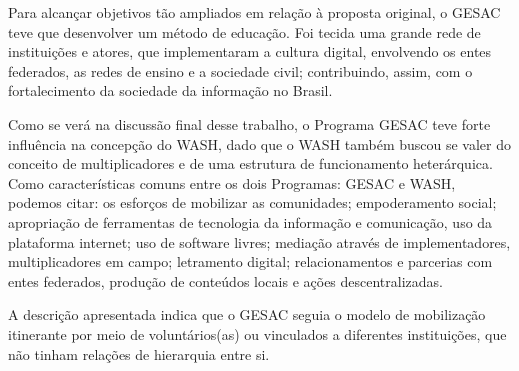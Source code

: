 \noindent\begin{center}\mbox{\centering{}}\end{center}


Para alcançar objetivos tão ampliados em relação à proposta original, o GESAC teve que desenvolver um método de educação. Foi tecida uma grande rede de instituições e atores, que  implementaram  a cultura digital, envolvendo os entes federados, as redes de ensino  e a sociedade civil;  contribuindo, assim, com o fortalecimento da sociedade da informação no Brasil.


\noindent\begin{center}\mbox{\centering{}}\end{center}


Como se verá na discussão final desse trabalho, o Programa GESAC teve forte influência na concepção do WASH, dado que o WASH também buscou se valer do conceito de multiplicadores e de uma estrutura de funcionamento heterárquica. Como características comuns entre os dois Programas: GESAC e WASH, podemos citar:  os esforços de mobilizar as comunidades; empoderamento social; apropriação de ferramentas de tecnologia da informação e comunicação, uso da plataforma internet; uso de software livres; mediação através de implementadores, multiplicadores em campo; letramento digital; relacionamentos e parcerias com entes federados, produção de conteúdos locais e ações descentralizadas.

A descrição apresentada indica que o GESAC seguia o modelo de mobilização itinerante por meio de voluntários(as) ou vinculados a diferentes instituições, que não tinham relações de hierarquia entre si.


